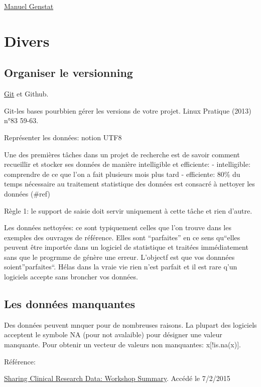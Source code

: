 \documentclass[]{article}
\begin{document}
\href{http://www.ilri.org/rmg/RMGcd/DataAnalysisAgroforestry/Materials/Other\%20documents/GenstatManual.pdf}{Manuel
Genstat}

\section{Divers}\label{divers}

\subsection{Organiser le versionning}\label{organiser-le-versionning}

\href{http://git-scm.com/book/fr/}{Git} et Github.

Git-les bases pourbbien gérer les versions de votre projet. Linux
Pratique (2013) n°83 59-63.

Représenter les données: notion UTF8

Une des premières tâches dans un projet de recherche est de savoir
comment recueillir et stocker ses données de manière intelligible et
efficiente: - intelligible: comprendre de ce que l'on a fait plusieurs
mois plus tard - efficiente: 80\% du temps nécessaire au traitement
statistique des données est consacré à nettoyer les données (\#ref)

Règle 1: le support de saisie doit servir uniquement à cette tâche et
rien d'autre.

Les données nettoyées: ce sont typiquement celles que l'on trouve dans
les exemples des ouvrages de référence. Elles sont ``parfaites'' en ce
sens qu``elles peuvent être importée dans un logiciel de statistique et
traitées immédiatement sans que le progrmme de génère une erreur.
L'objectf est que vos donnnées soient''parfaites``. Hélas dans la vraie
vie rien n'est parfait et il est rare q'un logiciels accepte sans
broncher vos données.

\subsection{Les données manquantes}\label{les-donnees-manquantes}

Des données peuvent mnquer pour de nombreuses raisons. La plupart des
logiciels acceptent le symbole NA (pour not avalaible) pour désigner une
valeur manquante. Pour obtenir un vecteur de valeurs non manquantes:
x{[}!is.na(x){]}.

Référence:

\href{http://www.nap.edu/catalog/18267/sharing-clinical-research-data-workshop-summary}{Sharing
Clinical Research Data: Workshop Summary}. Accédé le 7/2/2015
\end{document}
